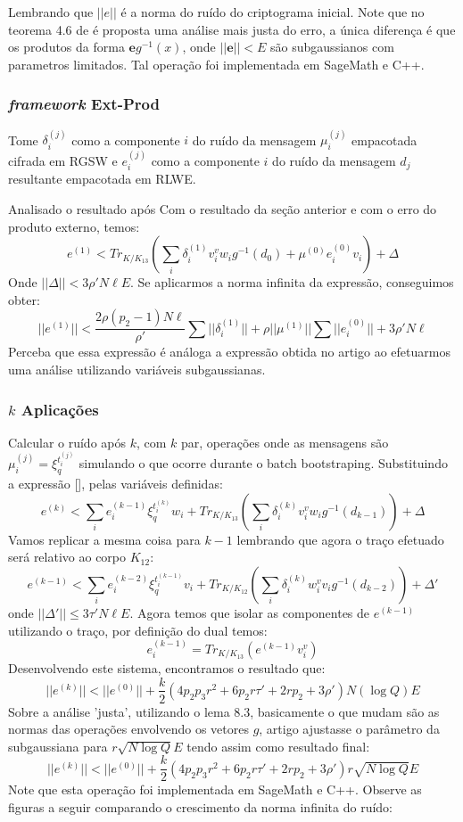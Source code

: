 Lembrando que $||e||$ é a norma do ruído do criptograma inicial. Note que no teorema 4.6 de \cite{lw23I} é proposta uma análise mais justa do erro, a única 
diferença é que os produtos da forma $\mathbf{e} g^{-1}(x)$, onde $||\mathbf{e}|| < E$ são subgaussianos com parametros limitados. Tal operação foi implementada em SageMath e C++.

\subsubsection{\emph{framework} Ext-Prod}
Tome $\delta_i^{(j)}$ como a componente $i$ do ruído da mensagem $\mu_i^{(j)}$ empacotada cifrada em RGSW e  $e_i^{(j)}$ como a componente $i$ do ruído da mensagem $d_j$ resultante empacotada em RLWE. 

Analisado o resultado após Com o resultado da seção anterior e com o erro do produto externo, temos:
$$
e^{(1)} < Tr_{K / K_{13}}(\sum_i \delta_i^{(1)} v_i^v w_i g^{-1}(d_0) + \mu^{(0)} e_i^{(0)}v_i) +  \Delta
$$
Onde $||\Delta|| < 3 \rho'N\ell E$. Se aplicarmos a norma infinita da expressão, conseguimos obter:
$$
||e^{(1)}|| < \frac{2\rho (p_2-1)N\ell}{\rho'}\sum ||\delta_i^{(1)}|| + \rho ||\mu^{(1)}||\sum||e_i^{(0)}|| + 3 \rho'N\ell
$$
Perceba que essa expressão é análoga a expressão obtida no artigo ao efetuarmos uma análise utilizando variáveis subgaussianas.

\subsubsection{$k$ Aplicações}
Calcular o ruído após $k$, com $k$ par, operações onde as mensagens são $\mu_i^{(j)} = \xi_q^{t^{(j)}_i}$ simulando o que ocorre durante o batch bootstraping. Substituindo a expressão [], pelas variáveis definidas:
$$
e^{(k)} < \sum_i e_i^{(k-1)} \xi_q^{t^{(k)}_i} w_i + Tr_{K / K_{13}}(\sum_i \delta_i^{(k)} v_i^v w_i g^{-1}(d_{k-1})) +  \Delta
$$
Vamos replicar a mesma coisa para $k-1$ lembrando que agora o traço efetuado será relativo ao corpo $K_{12}$:
$$
e^{(k-1)} < \sum_i e_i^{(k-2)} \xi_q^{t^{(k-1)}_i} v_i + Tr_{K / K_{12}}(\sum_i \delta_i^{(k)} w_i^v v_i g^{-1}(d_{k-2})) + \Delta'
$$
onde $||\Delta'|| \le 3 \tau'N\ell E$. Agora temos que isolar as componentes de $e^{(k-1)}$ utilizando o traço, por definição do dual temos:
$$
e_i^{(k-1)} = Tr_{K /K_{13}} (e^{(k-1)} v_i^v)
$$
Desenvolvendo este sistema, encontramos o resultado que:
$$
||e^{(k)}|| < ||e^{(0)}||+ \frac{k}{2}(4 p_2p_3r^2 + 6 p_2r \tau' + 2r p_2 + 3 \rho' ) N (\log Q) E
$$
Sobre a análise 'justa', utilizando o lema 8.3, basicamente o que mudam são as normas das operações envolvendo os vetores $g$, artigo ajustasse o parâmetro da subgaussiana para $r \sqrt{N \log Q} E$ tendo assim como resultado final:  
$$
||e^{(k)}|| < ||e^{(0)}||+ \frac{k}{2}(4 p_2p_3r^2 + 6 p_2r \tau' + 2r p_2 + 3 \rho' ) r \sqrt{N \log Q} E
$$
Note que esta operação foi implementada em SageMath e C++. Observe as figuras a seguir comparando o crescimento da norma infinita do ruído:

